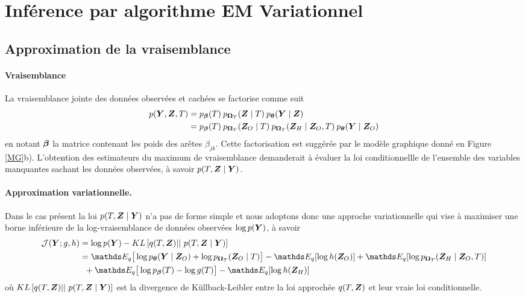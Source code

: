 \section{Inférence par algorithme EM Variationnel}

\subsection{Approximation de la vraisemblance}
 \paragraph{Vraisemblance}
 La vraisemblance jointe des données observées et cachées se factorise comme suit
\begin{align*}
p(\boldsymbol{Y},\boldsymbol{Z},T)& = p_{\boldsymbol{\beta}}(T) \: p_{\boldsymbol{\Omega}_T}(\boldsymbol{Z} \mid T) \: p_ {\boldsymbol{\theta}}(\boldsymbol{Y} \mid \boldsymbol{Z}) \\
&= p_{\boldsymbol{\beta}}(T) \: p_{\boldsymbol{\Omega}_T}(\boldsymbol{Z}_O \mid T) \: p_{\boldsymbol{\Omega}_T}(\boldsymbol{Z}_H  \mid  \boldsymbol{Z}_O,T)  \: p_{\boldsymbol{\theta}}(\boldsymbol{Y} \mid \boldsymbol{Z}_O)
\end{align*} 
en notant $\boldsymbol{\beta}$ la matrice contenant les poids des arêtes $\beta_{jk}$. Cette factorisation est suggérée par le modèle graphique donné en Figure \ref{MG}b).
L'obtention des estimateurs du maximum de vraisemblance demanderait à évaluer la loi conditionnellle de l'ensemble des variables manquantes sachant les données observées, à savoir $p(T, \boldsymbol{Z} \mid \boldsymbol{Y})$. 

\paragraph{Approximation variationnelle.}
 Dans le cas présent la loi $p(T, \boldsymbol{Z} \mid \boldsymbol{Y})$ n'a pas de forme simple et nous adoptons donc une approche variationnelle qui vise à maximiser une borne inférieure de la log-vraisemblance de données observées $\log p(\boldsymbol{Y})$, à savoir
\begin{align*}
    \mathcal{J}(\Ybf; g,h)
    & = \log p(\Ybf) - KL\left[q(T,\Zbf) \middle\vert\middle\vert\ p(T,\Zbf \mid \Ybf)\right]\\
    & =\Esp_{q}\big[\log p_{\thetabf}(\Ybf\mid \Zbf_O)+ \log p_{\Omegabf_T}(\Zbf_O \mid T)\big]-\Esp_q[\log h(\Zbf_O)]  +\Esp_{q}[\log p_{\Omegabf_T}(\Zbf_H \mid \Zbf_O,T)] \\
    & \;\; +\Esp_q\big[\log p_{\betabf}(T) - \log g(T)\big]  -\Esp_q[\log h(\Zbf_H)]
\end{align*}
 où $KL\left[q(T,\boldsymbol{Z}) \middle\vert\middle\vert\ p(T,\boldsymbol{Z} \mid \boldsymbol{Y})\right]$ est la divergence de Küllback-Leibler entre la loi approchée $q(T,\boldsymbol{Z})$  et leur vraie loi conditionnelle.

